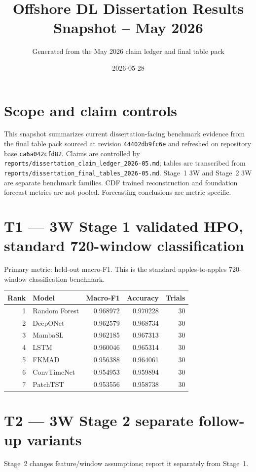 \documentclass[11pt]{article}
\begin{document}
\title{Offshore DL Dissertation Results Snapshot -- May 2026}
\author{Generated from the May 2026 claim ledger and final table pack}
\date{2026-05-28}
\maketitle

\section*{Scope and claim controls}
This snapshot summarizes current dissertation-facing benchmark evidence from the final table pack sourced at revision \texttt{44402db9fc6e} and refreshed on repository base \texttt{ca6a042cfd82}. Claims are controlled by \texttt{reports/dissertation\_claim\_ledger\_2026-05.md}; tables are transcribed from \texttt{reports/dissertation\_final\_tables\_2026-05.md}. Stage~1 3W and Stage~2 3W are separate benchmark families. CDF trained reconstruction and foundation forecast metrics are not pooled. Forecasting conclusions are metric-specific.

\section*{T1 --- 3W Stage 1 validated HPO, standard 720-window classification}
Primary metric: held-out macro-F1. This is the standard apples-to-apples 720-window classification benchmark.

\begin{tabular}{rlrrr}
\toprule
Rank & Model & Macro-F1 & Accuracy & Trials \\
\midrule
1 & Random Forest & 0.968972 & 0.970228 & 30 \\
2 & DeepONet & 0.962579 & 0.968734 & 30 \\
3 & MambaSL & 0.962185 & 0.967313 & 30 \\
4 & LSTM & 0.960046 & 0.965314 & 30 \\
5 & FKMAD & 0.956388 & 0.964061 & 30 \\
6 & ConvTimeNet & 0.954953 & 0.959894 & 30 \\
7 & PatchTST & 0.953556 & 0.958738 & 30 \\
\bottomrule
\end{tabular}

\section*{T2 --- 3W Stage 2 separate follow-up variants}
Stage~2 changes feature/window assumptions; report it separately from Stage~1.
\end{document}
